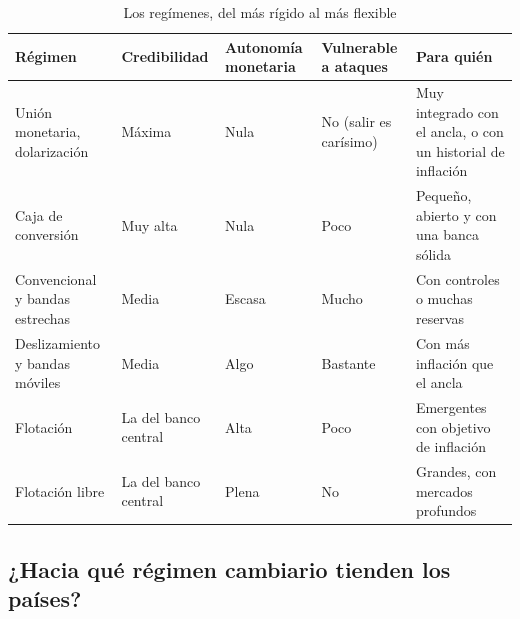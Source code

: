 \documentclass[11pt]{article}
\begin{document}
\begin{table}[H]
\centering
\caption{Los regímenes, del más rígido al más flexible}\label{tab:intermedios}
\small
\begin{tabular}{>{\raggedright\arraybackslash}m{3.0cm}>{\centering\arraybackslash}m{2.3cm}>{\centering\arraybackslash}m{2.2cm}>{\centering\arraybackslash}m{2.3cm}>{\raggedright\arraybackslash}m{4.2cm}}
\toprule
\rowcolor{tceeazulpalido}\textbf{Régimen} & \textbf{Credibilidad} & \textbf{Autonomía monetaria} & \textbf{Vulnerable a ataques} & \textbf{Para quién}\\
\midrule
Unión monetaria, dolarización & \textcolor{tceeverde}{Máxima} & \textcolor{tceerojo}{Nula} & \textcolor{tceeverde}{No} (salir es carísimo) & Muy integrado con el ancla, o con un historial de inflación\\
Caja de conversión & \textcolor{tceeverde}{Muy alta} & \textcolor{tceerojo}{Nula} & \textcolor{tceedorado}{Poco} & Pequeño, abierto y con una banca sólida\\
Convencional y bandas estrechas & \textcolor{tceedorado}{Media} & \textcolor{tceerojo}{Escasa} & \textcolor{tceerojo}{Mucho} & Con controles o muchas reservas\\
Deslizamiento y bandas móviles & \textcolor{tceedorado}{Media} & \textcolor{tceedorado}{Algo} & \textcolor{tceerojo}{Bastante} & Con más inflación que el ancla\\
Flotación & \textcolor{tceedorado}{La del banco central} & \textcolor{tceeverde}{Alta} & \textcolor{tceeverde}{Poco} & Emergentes con objetivo de inflación\\
Flotación libre & \textcolor{tceedorado}{La del banco central} & \textcolor{tceeverde}{Plena} & \textcolor{tceeverde}{No} & Grandes, con mercados profundos\\
\bottomrule
\end{tabular}
\end{table}

\subsection{¿Hacia qué régimen cambiario tienden los países?}\label{sec:tendencias}
\end{document}
